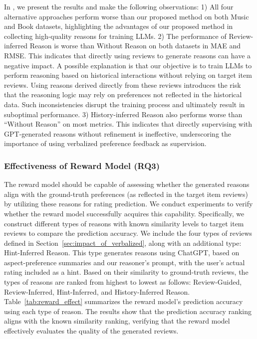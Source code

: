 In , we present the results and make the following observations:
1) All four alternative approaches perform worse than our proposed method on both Music and Book datasets, highlighting the advantages of our proposed method in collecting high-quality reasons for training LLMs.
2) The performance of Review-inferred Reason is worse than Without Reason on both datasets in MAE and RMSE. This indicates that directly using reviews to generate reasons can have a negative impact. A possible explanation is that our objective is to train LLMs to perform reasoning based on historical interactions without relying on target item reviews. Using reasons derived directly from these reviews introduces the risk that the reasoning logic may rely on preferences not reflected in the historical data.
Such inconsistencies disrupt the training process and ultimately result in suboptimal performance.
3) History-inferred Reason also performs worse than ``Without Reason'' on most metrics. This indicates that directly supervising with GPT-generated reasons without refinement is ineffective, underscoring the importance of using verbalized preference feedback as supervision.



\subsubsection{\textbf{Effectiveness of Reward Model (RQ3)}} \label{sec:reasonable_of_reward}



The reward model should be capable of assessing whether the generated reasons align with the ground-truth preferences (as reflected in the target item reviews) by utilizing these reasons for rating prediction.
We conduct experiments to verify whether the reward model successfully acquires this capability. Specifically, we construct different types of reasons with known similarity levels to target item reviews to compare the prediction accuracy. We include the four types of reviews defined in Section~\ref{sec:impact_of_verbalized}, along with an additional type: Hint-Inferred Reason. This type generates reasons using ChatGPT, based on aspect-preference summaries and our reasoner's prompt, with the user's actual rating included as a hint. Based on their similarity to ground-truth reviews, the types of reasons are ranked from highest to lowest as follows: Review-Guided, Review-Inferred, Hint-Inferred, and History-Inferred Reason. Table~\ref{tab:reward_effect} summarizes the reward model's prediction accuracy using each type of reason. The results show that the prediction accuracy ranking aligns with the known similarity ranking, verifying that the reward model effectively evaluates the quality of the generated reviews.



